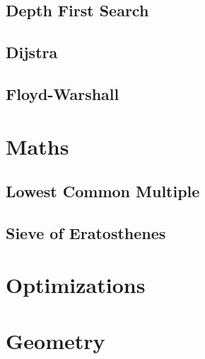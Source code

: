 \documentclass[10pt,a4paper]{article}
\begin{document}
\begin{landscape}
\begin{multicols}{2}


\subsection{Depth First Search}



\subsection{Dijstra}



\subsection{Floyd-Warshall}



\section{Maths}

\subsection{Lowest Common Multiple}



\subsection{Sieve of Eratosthenes}



\section{Optimizations}

\section{Geometry}

\end{multicols}
\end{landscape}
\end{document}
